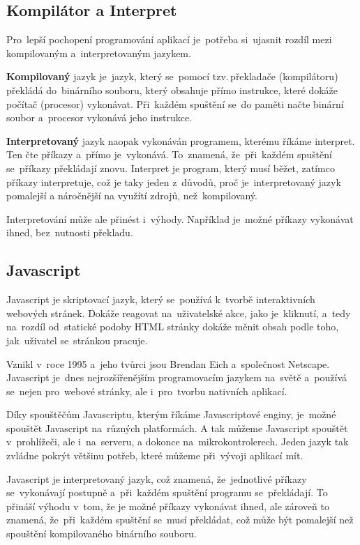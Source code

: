 \documentclass[14pt,a4paper]{article}
\begin{document}
        \subsection{Kompilátor a Interpret}
        Pro~lepší pochopení programování aplikací je~potřeba si~ujasnit rozdíl mezi kompilovaným a~interpretovaným jazykem.

        \textbf{Kompilovaný} jazyk je~jazyk, který se~pomocí tzv.\,překladače (kompilátoru) překládá do~binárního souboru, který obsahuje přímo instrukce,
        které dokáže počítač (procesor) vykonávat. Při~každém spuštění se~do paměti načte binární soubor a~procesor vykonává jeho instrukce.

        \textbf{Interpretovaný} jazyk naopak vykonáván programem, kterému říkáme interpret. Ten čte příkazy a~přímo je~vykonává. To~znamená,
        že~při~každém spuštění se~příkazy překládají znovu. Interpret je program, který musí běžet, zatímco příkazy interpretuje,
        což je taky jeden z~důvodů, proč je~interpretovaný jazyk pomalejší a náročnější na využítí zdrojů, než~kompilovaný.
        
        Interpretování může ale přinést i~výhody. Například je~možné příkazy vykonávat ihned, bez~nutnosti překladu. \parencite{ueda:compiled}
        
        \subsection{Javascript}
        Javascript je skriptovací jazyk, který se~používá k~tvorbě interaktivních webových stránek. Dokáže reagovat na~uživatelské akce,
        jako je~kliknutí, a~tedy na~rozdíl od~statické podoby HTML stránky dokáže měnit obsah podle toho, jak~uživatel se~stránkou pracuje.

        Vznikl v~roce 1995 a~jeho tvůrci jsou Brendan Eich a~společnost Netscape.
        Javascript je~dnes nejrozšířenějším programovacím jazykem na~světě a~používá se~nejen pro~webové stránky,
        ale i~pro~tvorbu nativních aplikací.

        Díky spouštěčům Javascriptu, kterým říkáme Javascriptové enginy, je~možné spouštět Javascript na~různých platformách.
        A tak můžeme Javascript spouštět v~prohlížeči, ale i~na~serveru, a dokonce na~mikrokontrolerech. Jeden jazyk tak zvládne pokrýt
        většinu potřeb, které můžeme při~vývoji aplikací mít.

        Javascript je interpretovaný jazyk, což znamená, že~jednotlivé příkazy se~vykonávají postupně a~při~každém spuštění programu se~překládají.
        To přináší výhodu v~tom, že je možné příkazy vykonávat ihned, ale zároveň to znamená, že~při~každém spuštění se~musí překládat, což může být pomalejší než spouštění kompilovaného binárního souboru.
\end{document}
